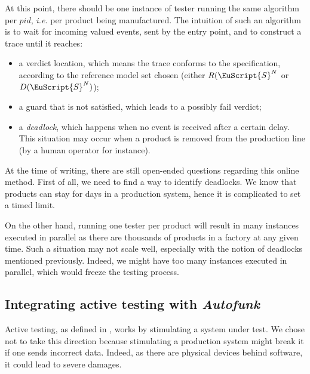 At this point, there should be one instance of tester running the
same algorithm per $pid$, \emph{i.e.} per product being
manufactured. The intuition of such an algorithm is to wait for
incoming valued events, sent by the entry point, and to construct
a trace until it reaches:


\begin{itemize}
    \item a verdict location, which means the trace conforms to
        the specification, according to the reference model set
        chosen (either $R(\EuScript{S}^N$ or
        $D(\EuScript{S}^N)$);

    \item a guard that is not satisfied, which leads to a
        possibly fail verdict;

    \item a \emph{deadlock}, which happens when no event is
        received after a certain delay. This situation may occur
        when a product is removed from the production line (by a
        human operator for instance).
\end{itemize}

At the time of writing, there are still open-ended questions
regarding this online method. First of all, we need to find a way
to identify deadlocks. We know that products can stay for days in
a production system, hence it is complicated to set a timed
limit.

On the other hand, running one tester per product will result in
many instances executed in parallel as there are thousands of
products in a factory at any given time. Such a situation may not
scale well, especially with the notion of deadlocks mentioned
previously. Indeed, we might have too many instances executed in
parallel, which would freeze the testing process.



\subsection{Integrating active testing with \emph{Autofunk}}
\label{sec:conclusion:testing:active}

Active testing, as defined in
,
works by stimulating a system under test. We chose not to take
this direction because stimulating a production system might
break it if one sends incorrect data. Indeed, as there are
physical devices behind software, it could lead to severe
damages.

